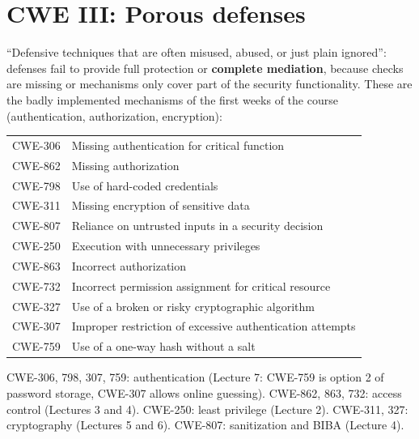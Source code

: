 \section{CWE III: Porous defenses}

\begin{defnbox}[title={Porous defenses}]
``Defensive techniques that are often misused, abused, or just plain ignored'': defenses fail to
provide full protection or \textbf{complete mediation}, because checks are missing or mechanisms
only cover part of the security functionality. These are the badly implemented mechanisms of the
first weeks of the course (authentication, authorization, encryption):
\begin{center}
\small
\begin{tabularx}{\linewidth}{l|X}
CWE-306 & Missing authentication for critical function \\
CWE-862 & Missing authorization \\
CWE-798 & Use of hard-coded credentials \\
CWE-311 & Missing encryption of sensitive data \\
CWE-807 & Reliance on untrusted inputs in a security decision \\
CWE-250 & Execution with unnecessary privileges \\
CWE-863 & Incorrect authorization \\
CWE-732 & Incorrect permission assignment for critical resource \\
CWE-327 & Use of a broken or risky cryptographic algorithm \\
CWE-307 & Improper restriction of excessive authentication attempts \\
CWE-759 & Use of a one-way hash without a salt
\end{tabularx}
\end{center}
\end{defnbox}

\begin{rembox}[title=Each porous defense is a lecture]
CWE-306, 798, 307, 759: authentication (Lecture 7: CWE-759 is option 2 of password storage, CWE-307
allows online guessing). CWE-862, 863, 732: access control (Lectures 3 and 4). CWE-250: least
privilege (Lecture 2). CWE-311, 327: cryptography (Lectures 5 and 6). CWE-807: sanitization and
BIBA (Lecture 4).
\end{rembox}
